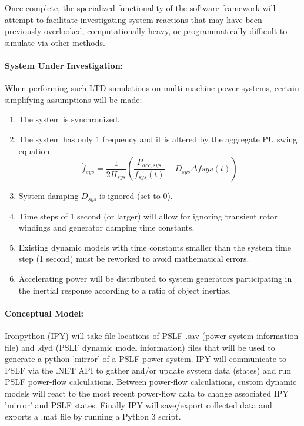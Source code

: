\documentclass[12pt]{article}
\begin{document}
Once complete, the specialized functionality of the software framework will attempt to facilitate investigating system reactions that may have been previously overlooked, computationally heavy, or programmatically difficult to simulate via other methods.
\paragraph{System Under Investigation:}
When performing such LTD simulations on multi-machine power systems, certain simplifying assumptions will be made:
\begin{enumerate}
	\item The system is synchronized.
	\item The system has only 1 frequency and it is altered by the aggregate PU swing equation
	\[ \dot{f}_{sys} = \dfrac{1}{2H_{sys} } \left( \dfrac{P_{acc, sys} }{f_{sys}(t)} - D_{sys}\Delta f{sys}(t)  \right)  \]
	\item System damping $D_{sys}$ is ignored (set to 0).
	\item Time steps of 1 second (or larger) will allow for ignoring transient rotor windings and generator damping time constants. 
	\item Existing dynamic models with time constants smaller than the system time step (1 second) must be reworked to avoid mathematical errors.
	\item Accelerating power will be distributed to system generators participating in the inertial response according to a ratio of object inertias.
\end{enumerate}

\pagebreak
\paragraph{Conceptual Model:}
Ironpython (IPY) will take file locations of PSLF .sav (power system information file) and .dyd (PSLF dynamic model information) files that will be used to generate a python 'mirror' of a PSLF power system. 
IPY will communicate to PSLF via the .NET API to gather and/or update system data (states) and run PSLF power-flow calculations. 
Between power-flow calculations, custom dynamic models will react to the most recent power-flow data to change associated IPY 'mirror' and PSLF states.  
Finally IPY will save/export collected data and exports a .mat file by running a Python 3 script.\\
\end{document}
